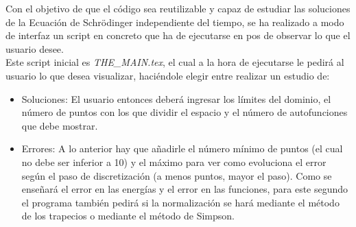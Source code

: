 \documentclass[12pt]{article}
\begin{document}
Con el objetivo de que el código sea reutilizable y capaz de estudiar las soluciones de la Ecuación de Schrödinger independiente del tiempo, se ha realizado a modo de interfaz un script en concreto que ha de ejecutarse en pos de observar lo que el usuario desee.\\

Este script inicial es \textit{THE\_MAIN.tex}, el cual a la hora de ejecutarse le pedirá al usuario lo que desea visualizar, haciéndole elegir entre realizar un estudio de:

\begin{itemize}
    \item Soluciones: El usuario entonces deberá ingresar los límites del dominio, el número de puntos con los que dividir el espacio y el número de autofunciones que debe mostrar.

    \item Errores: A lo anterior hay que añadirle el número mínimo de puntos (el cual no debe ser inferior a 10) y el máximo para ver como evoluciona el error según el paso de discretización (a menos puntos, mayor el paso). Como se enseñará el error en las energías y el error en las funciones, para este segundo el programa también pedirá si la normalización se hará mediante el método de los trapecios o mediante el método de Simpson.

\end{itemize}

\nocite{*}
\printbibliography
\end{document}
